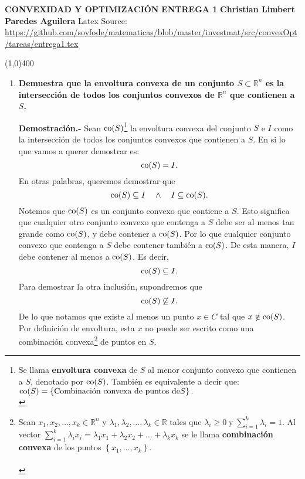 \center \textbf{CONVEXIDAD Y OPTIMIZACIÓN}
\center \textbf{\Large ENTREGA 1}
\center \textbf{ \textbf{Christian Limbert Paredes Aguilera}}
\center Latex Source: \url{https://github.com/soyfode/matematicas/blob/master/investmat/src/convexOpt/tareas/entrega1.tex}

\line(1,0){400}



\begin{enumerate}

    \item \textbf{\boldmath Demuestra que la envoltura convexa de un conjunto $S\subset \mathbb{R}^n$ es la intersección de todos los conjuntos convexos de $\mathbb{R}^n$ que contienen a $S$.}

	\textbf{Demostración.-}\; Sean $\mathop{\mbox{\normalfont co}}\nolimits(S)$\footnote{
	Se llama \textbf{envoltura convexa} de $S$ al menor conjunto convexo que contienen a $S$, denotado por $\mathop{\mbox{\normalfont co}}\nolimits(S)$.
	También es equivalente a decir que:
	$\mathop{\mbox{\normalfont co}}\nolimits(S)=\left\{\mbox{Combinación convexa de puntos de} S\right\}.$\\
	\label{envoltura}}
	la envoltura convexa del conjunto $S$ e $I$ como la intersección de todos los conjuntos convexos que contienen a $S$. En si lo que vamos a querer demostrar es:
	$$\mathop{\mbox{\normalfont co}}\nolimits(S)=I.$$
	En otras palabras, queremos demostrar que
	$$\mathop{\mbox{\normalfont co}}\nolimits(S)\subseteq I \quad \land \quad I\subseteq \mathop{\mbox{\normalfont co}}\nolimits(S).$$
	Notemos que $\mathop{\mbox{\normalfont co}}\nolimits(S)$ es un conjunto convexo que contiene a $S$. Esto significa que cualquier otro conjunto convexo que contenga a $S$ debe ser al menos tan grande como $\mathop{\mbox{\normalfont co}}\nolimits(S)$, y debe contener a $\mathop{\mbox{\normalfont co}}\nolimits(S)$. Por lo que cualquier conjunto convexo que contenga a $S$ debe contener también a $\mathop{\mbox{\normalfont co}}\nolimits(S)$. De esta manera, $I$ debe contener al menos a $\mathop{\mbox{\normalfont co}}\nolimits(S)$. Es decir,
	$$\mathop{\mbox{\normalfont co}}\nolimits(S)\subseteq I.$$
	Para demostrar la otra inclusión, supondremos que 
	$$\mathop{\mbox{\normalfont co}}\nolimits(S)\not\subseteq I.$$
	De lo que notamos que existe al menos un punto $x\in C$ tal que $x\notin \mathop{\mbox{\normalfont co}}\nolimits(S)$. Por definición de envoltura, esta $x$ no puede ser escrito como una combinación convexa\footnote{
	Sean $x_1,x_2,\ldots,x_k\in \mathbb{R}^n$ y $\lambda_1,\lambda_2,\ldots,\lambda_k\in \mathbb{R}$ tales que 
	$\lambda_i\geq 0\; \text{y} \;\sum_{i=1}^{k}\lambda_i=1.$ 
	Al vector
	$\sum_{i=1}^{k}\lambda_ix_i=\lambda_1x_1+\lambda_2x_2+\ldots+\lambda_kx_k$
	se le llama \textbf{combinación convexa} de los puntos $\left\{x_1,\ldots,x_k\right\}$.\\\\
	} de puntos en $S$.


\end{enumerate}
